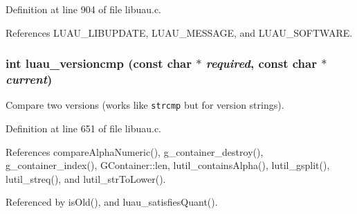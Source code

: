 Definition at line 904 of file libuau.c.

References LUAU\_\-LIBUPDATE, LUAU\_\-MESSAGE, and LUAU\_\-SOFTWARE.
\subsubsection{\setlength{\rightskip}{0pt plus 5cm}int luau\_\-versioncmp (const char $\ast$ {\em required}, const char $\ast$ {\em current})}\label{libuau_8c_a21}


Compare two versions (works like {\tt strcmp} but for version strings). 



Definition at line 651 of file libuau.c.

References compare\-Alpha\-Numeric(), g\_\-container\_\-destroy(), g\_\-container\_\-index(), GContainer::len, lutil\_\-contains\-Alpha(), lutil\_\-gsplit(), lutil\_\-streq(), and lutil\_\-str\-To\-Lower().

Referenced by is\-Old(), and luau\_\-satisfies\-Quant().